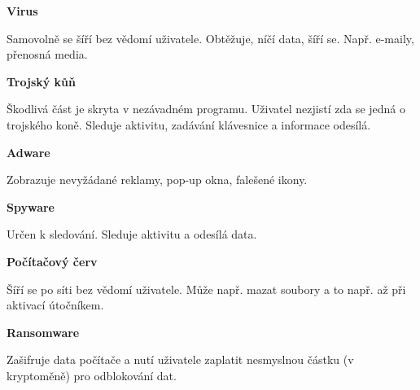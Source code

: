 \documentclass[aspectratio=169]{beamer}
\begin{document}
\begin{frame}
    \begin{multicols}{2}
        \centering

        \begin{cardTiny}
            \begin{flushleft}
                \textbf{Virus}

                Samovolně se šíří bez vědomí uživatele. Obtěžuje, níčí data, šíří se. Např. e-maily, přenosná media.
            \end{flushleft}
        \end{cardTiny}

        \begin{cardTiny}
            \begin{flushleft}
                \textbf{Trojský kůň}

                Škodlivá část je skryta v nezávadném programu. Uživatel nezjistí zda se jedná o trojského koně. Sleduje aktivitu, zadávání klávesnice a informace odesílá.
            \end{flushleft}
        \end{cardTiny}

        \begin{cardTiny}
            \begin{flushleft}
                \textbf{Adware}

                Zobrazuje nevyžádané reklamy, pop-up okna, falešené ikony.
            \end{flushleft}
        \end{cardTiny}

        \begin{cardTiny}
            \begin{flushleft}
                \textbf{Spyware}

                Určen k sledování. Sleduje aktivitu a odesílá data.
            \end{flushleft}
        \end{cardTiny}

        \begin{cardTiny}
            \begin{flushleft}
                \textbf{Počítačový červ}

                Šíří se po síti bez vědomí uživatele. Může např. mazat soubory a to např. až při aktivací útočníkem.
            \end{flushleft}
        \end{cardTiny}

        \begin{cardTiny}
            \begin{flushleft}
                \textbf{Ransomware}

                Zašifruje data počítače a nutí uživatele zaplatit nesmyslnou částku (v kryptoměně) pro odblokování dat.
            \end{flushleft}
        \end{cardTiny}
    \end{multicols}
\end{frame}
\end{document}
